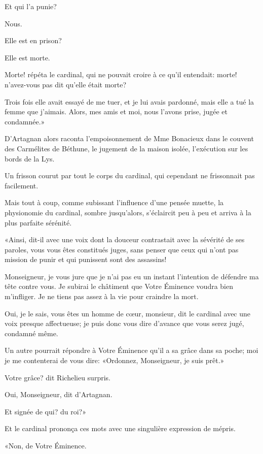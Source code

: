 \speak  Et qui l'a punie? 

\speak  Nous. 

\speak  Elle est en prison? 

\speak  Elle est morte. 

\speak  Morte! répéta le cardinal, qui ne pouvait croire à ce qu'il entendait: morte! n'avez-vous pas dit qu'elle était morte? 

\speak  Trois fois elle avait essayé de me tuer, et je lui avais pardonné, mais elle a tué la femme que j'aimais. Alors, mes amis et moi, nous l'avons prise, jugée et condamnée.» 

D'Artagnan alors raconta l'empoisonnement de Mme Bonacieux dans le couvent des Carmélites de Béthune, le jugement de la maison isolée, l'exécution sur les bords de la Lys. 

Un frisson courut par tout le corps du cardinal, qui cependant ne frissonnait pas facilement. 

Mais tout à coup, comme subissant l'influence d'une pensée muette, la physionomie du cardinal, sombre jusqu'alors, s'éclaircit peu à peu et arriva à la plus parfaite sérénité. 

«Ainsi, dit-il avec une voix dont la douceur contrastait avec la sévérité de ses paroles, vous vous êtes constitués juges, sans penser que ceux qui n'ont pas mission de punir et qui punissent sont des assassins! 

\speak  Monseigneur, je vous jure que je n'ai pas eu un instant l'intention de défendre ma tête contre vous. Je subirai le châtiment que Votre Éminence voudra bien m'infliger. Je ne tiens pas assez à la vie pour craindre la mort. 

\speak  Oui, je le sais, vous êtes un homme de cœur, monsieur, dit le cardinal avec une voix presque affectueuse; je puis donc vous dire d'avance que vous serez jugé, condamné même. 

\speak  Un autre pourrait répondre à Votre Éminence qu'il a sa grâce dans sa poche; moi je me contenterai de vous dire: «Ordonnez, Monseigneur, je suis prêt.» 

\speak  Votre grâce? dit Richelieu surpris. 

\speak  Oui, Monseigneur, dit d'Artagnan. 

\speak  Et signée de qui? du roi?» 

Et le cardinal prononça ces mots avec une singulière expression de mépris. 

«Non, de Votre Éminence. 

